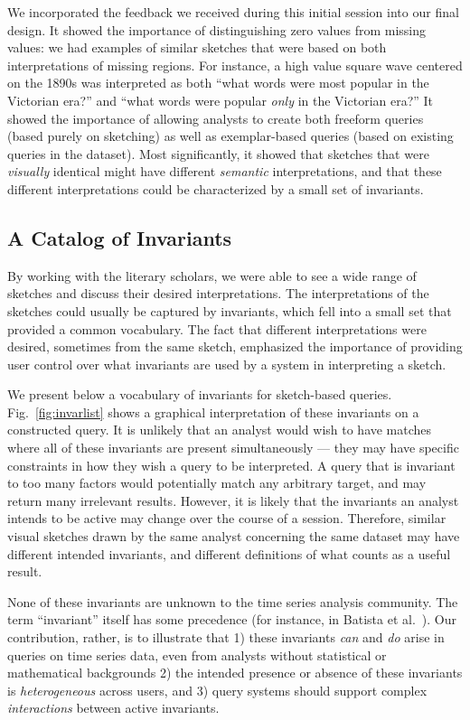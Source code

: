 We incorporated the feedback we received during this initial session into our final design. It showed the importance of distinguishing zero values from missing values: we had examples of similar sketches that were based on both interpretations of missing regions. For instance, a high value square wave centered on the 1890s was interpreted as both ``what words were most popular in the Victorian era?'' and ``what words were popular \emph{only} in the Victorian era?'' It showed the importance of allowing analysts to create both freeform queries (based purely on sketching) as well as exemplar-based queries (based on existing queries in the dataset). Most significantly, it showed that sketches that were \emph{visually} identical might have different \emph{semantic} interpretations, and that these different interpretations could be characterized by a small set of invariants. 

\subsection{A Catalog of Invariants}
\invarlistFig

By working with the literary scholars, we were able to see a wide range of sketches and discuss their desired interpretations. The interpretations of the sketches could usually be captured by invariants, which fell into a small set that provided a common vocabulary. The fact that different interpretations were desired, sometimes from the same sketch, emphasized the importance of providing user control over what invariants are used by a system in interpreting a sketch.

We present below a vocabulary of invariants for sketch-based queries. Fig.~\ref{fig:invarlist} shows a graphical interpretation of these invariants on a constructed query. It is unlikely that an analyst would wish to have matches where all of these invariants are present simultaneously --- they may have specific constraints in how they wish a query to be interpreted. A query that is invariant to too many factors would potentially match any arbitrary target, and may return many irrelevant results. However, it is likely that the invariants an analyst intends to be active may change over the course of a session. Therefore, similar visual sketches drawn by the same analyst concerning the same dataset may have different intended invariants, and different definitions of what counts as a useful result.

None of these invariants are unknown to the time series analysis community. The term ``invariant'' itself has some precedence (for instance, in Batista et al.~\cite{batista2011complexity}). Our contribution, rather, is to illustrate that 1) these invariants \emph{can} and \emph{do} arise in queries on time series data, even from analysts without statistical or mathematical backgrounds 2) the intended presence or absence of these invariants is \emph{heterogeneous} across users, and 3) query systems should support complex \emph{interactions} between active invariants.

